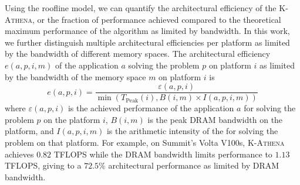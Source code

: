 \documentclass[10pt,journal,compsoc]{IEEEtran}
\newcommand{\textcode}[1]{\textsc{#1}}
\newcommand{\kathena}{\textcode{K-Athena}\xspace}
\begin{document}
Using the roofline model, we can quantify the architectural efficiency of the
\kathena, or the fraction of performance achieved compared to the theoretical
maximum performance of the algorithm as limited by bandwidth. In this work, we
further distinguish multiple architectural efficiencies per platform as limited
by the bandwidth of different memory spaces. The architectural efficiency
$e(a,p,i,m)$ of the application $a$ solving the problem $p$ on platform $i$ as
limited by the bandwidth of the memory space $m$ on platform $i$ is 
\begin{equation} 
  e(a,p,i)
  = \frac{\varepsilon(a,p,i)}{\min \left ( T_{\text{Peak}}(i), B(i,m) \times
I(a,p,i,m) \right ) } 
\end{equation} 
where $\varepsilon(a,p,i)$ is the
achieved performance of the application $a$ for solving the problem $p$ on the
platform $i$, $B(i,m)$ is the peak DRAM bandwidth on the platform, and
$I(a,p,i,m)$ is the arithmetic intensity of the  for solving the problem on
that platform.  For example, on Summit's Volta V100s, \kathena achieves $0.82$
TFLOPS while the DRAM bandwidth limits performance to $1.13$ TFLOPS, giving to a
$72.5\%$ architectural performance as limited by DRAM bandwidth. 
\end{document}
